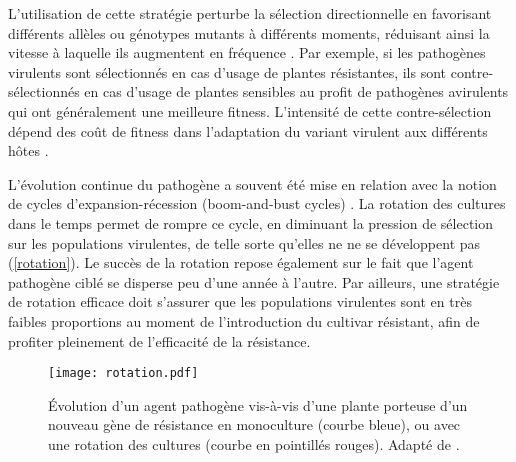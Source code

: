 	L'utilisation de cette stratégie  perturbe la sélection directionnelle en favorisant différents allèles ou génotypes mutants à différents moments, réduisant ainsi la vitesse à laquelle ils augmentent en fréquence \citep{McDonald2002}.
Par exemple, si les pathogènes virulents sont sélectionnés en cas d'usage de plantes résistantes, ils sont contre-sélectionnés en cas d'usage de plantes sensibles au profit de pathogènes avirulents qui ont généralement une meilleure fitness. L’intensité de cette contre-sélection dépend des coût de fitness dans l’adaptation du variant virulent aux différents hôtes \citep{Zhan2015, Brown2015, Brown2011}. 

	L’évolution continue du pathogène  a souvent été mise en relation avec la notion de cycles d'expansion-récession (boom-and-bust cycles) \citep{Brown2015, McDonald2002, Zhan2015}. La  rotation des cultures dans le temps permet de rompre ce cycle, en diminuant la pression de sélection sur les populations virulentes,  de telle sorte  qu'elles ne ne se développent pas  (\autoref{rotation}).  Le succès de la rotation repose  également sur le fait que l'agent pathogène ciblé  se disperse peu d'une année à l'autre.  Par ailleurs, une stratégie de rotation efficace doit s'assurer que les populations virulentes sont en très faibles proportions au moment de l'introduction du cultivar résistant, afin de profiter pleinement de l'efficacité de la résistance.


\begin{figure}
	\centering \texttt{[image: rotation.pdf]}
		\caption[Évolution  d’un agent pathogène vis-à-vis d'une plante porteuse d’un
		nouveau gène de résistance en monoculture  ou avec une rotation
		des cultures]{Évolution  d’un agent pathogène vis-à-vis d'une plante porteuse d’un
		nouveau gène de résistance en monoculture (courbe bleue), ou avec une rotation
		des cultures (courbe en pointillés rouges).  Adapté de \citep{Zhan2015}.
		}
		\label{rotation}
\end{figure}


